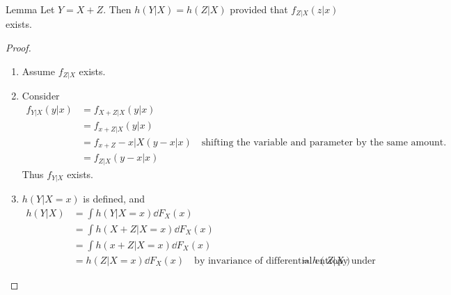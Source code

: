 \documentclass[../main.tex]{subfiles}
\begin{document}
\begin{bbox}{Lemma}
    Let $Y=X+Z$. Then $h(Y|X)=h(Z|X)$ provided that $f_{Z|X}(z|x)$ exists.
    \begin{proof}
        \begin{enumerate}
            \item Assume $f_{Z|X}$ exists.
            \item Consider \begin{align*}
                f_{Y|X}(y|x) &= f_{X+Z|X}(y|x)\\
                &=f_{x+Z|X}(y|x)\\
                &=f_{x+Z}-x|X(y-x|x)\quad\text{shifting the variable and parameter by the same amount.}\\
                &=f_{Z|X}(y-x|x)
            \end{align*}
            Thus $f_{Y|X}$ exists.
            \item $h(Y|X=x)$ is defined, and \begin{align*}
            h(Y|X) &= \int h(Y|X=x)\dd F_X(x)\\
            &= \int h(X+Z|X=x)\dd F_X(x)\\
            &=\int  h(x+Z|X=x)\dd F_X(x)\\
            &= h(Z|X=x)\dd F_X(x) \quad\text{by invariance of differential entropy under translation}
            &=h(Z|X)
            \end{align*}
        \end{enumerate}
    \end{proof}
\end{bbox}
\end{document}

